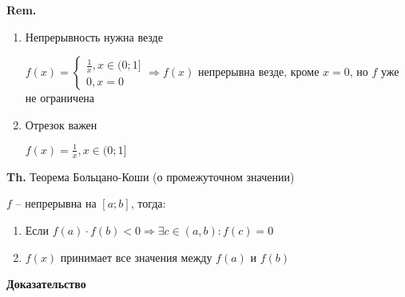 \documentclass[14pt, letter paper]{article}
\begin{document}
\textbf{Rem.}

\begin{enumerate}
    \item Непрерывность нужна везде

    $f(x) = \begin{cases}
        \frac{1}{x}, x \in (0; 1] \\
        0, x = 0
    \end{cases} \Rightarrow f(x)$ непрерывна везде, кроме $x = 0$, но $f$ уже не ограничена

    \item Отрезок важен

    $f(x) = \frac{1}{x}, x \in (0; 1]$
\end{enumerate}

\vspace{5mm}

\textbf{Th.} Теорема Больцано-Коши (о промежуточном значении)

$f$ -- непрерывна на $[a;b]$, тогда:

\begin{enumerate}
    \item Если $f(a) \cdot f(b) < 0 \Rightarrow \exists c \in (a, b) : f(c) = 0$
    \item $f(x)$ принимает все значения между $f(a)$ и $f(b)$
\end{enumerate}

\begin{center}
    \textbf{Доказательство}
\end{center}
\end{document}
